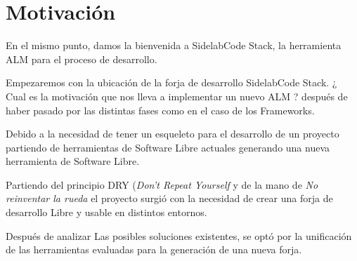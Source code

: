 \documentclass[11pt]{scrartcl}
\begin{document}
















\section{Motivaci\'on}
\label{sec:motivacion}

\par En el mismo punto, damos la bienvenida a SidelabCode Stack, la herramienta ALM para el proceso de desarrollo. 

\par Empezaremos con la ubicación de la forja de desarrollo SidelabCode Stack. ¿ Cual es la motivación que nos lleva a implementar un nuevo ALM ? después de haber pasado por las distintas fases como en el caso de los Frameworks.

\par Debido a la necesidad de tener un esqueleto para el desarrollo de un proyecto partiendo de herramientas de Software Libre actuales generando una nueva herramienta de Software Libre.

\par Partiendo del principio DRY (\emph{Don't Repeat Yourself} y de la mano de \emph{No reinventar la rueda} el proyecto surgió con la necesidad de crear una forja de desarrollo Libre y usable en distintos entornos.

\par Después de analizar Las posibles soluciones existentes, se optó por la unificación de las herramientas evaluadas para la generación de una nueva forja. 
\end{document}
